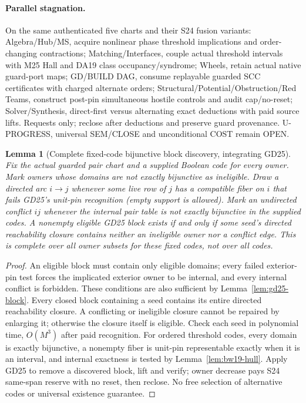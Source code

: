 \documentclass[11pt]{article}
\newtheorem{lemma}[theorem]{Lemma}
\begin{document}
\paragraph{Parallel stagnation.}
On the same authenticated five charts and their S24 fusion variants: Algebra/Hub/MS, acquire nonlinear phase threshold implications and order-changing contractions; Matching/Interfaces, couple actual threshold intervals with M25 Hall and DA19 class occupancy/syndrome; Wheels, retain actual native guard-port maps; GD/BUILD DAG, consume replayable guarded SCC certificates with charged alternate orders; Structural/Potential/Obstruction/Red Teams, construct post-pin simultaneous hostile controls and audit cap/no-reset; Solver/Synthesis, direct-first versus alternating exact deductions with paid source lifts. Requests only; reclose after deductions and preserve guard provenance. U-PROGRESS, universal SEM/CLOSE and unconditional COST remain OPEN.


\begin{lemma}[Complete fixed-code bijunctive block discovery, integrating GD25]\label{lem:bw19-discover}
Fix the actual guarded pair chart and a supplied Boolean code for every owner. Mark owners whose domains are not exactly bijunctive as ineligible. Draw a directed arc $i\to j$ whenever some live row of $j$ has a compatible fiber on $i$ that fails GD25's unit-pin recognition (empty support is allowed). Mark an undirected conflict $ij$ whenever the internal pair table is not exactly bijunctive in the supplied codes. A nonempty eligible GD25 block exists if and only if some seed's directed reachability closure contains neither an ineligible owner nor a conflict edge. This is complete over all owner subsets for these fixed codes, not over all codes.
\end{lemma}
\begin{proof}
An eligible block must contain only eligible domains; every failed exterior-pin test forces the implicated exterior owner to be internal, and every internal conflict is forbidden. These conditions are also sufficient by Lemma~\ref{lem:gd25-block}. Every closed block containing a seed contains its entire directed reachability closure. A conflicting or ineligible closure cannot be repaired by enlarging it; otherwise the closure itself is eligible. Check each seed in polynomial time, $O(M^3)$ after paid recognition. For ordered threshold codes, every domain is exactly bijunctive, a nonempty fiber is unit-pin representable exactly when it is an interval, and internal exactness is tested by Lemma~\ref{lem:bw19-hull}. Apply GD25 to remove a discovered block, lift and verify; owner decrease pays S24 same-span reserve with no reset, then reclose. No free selection of alternative codes or universal existence guarantee.
\end{proof}
\end{document}
